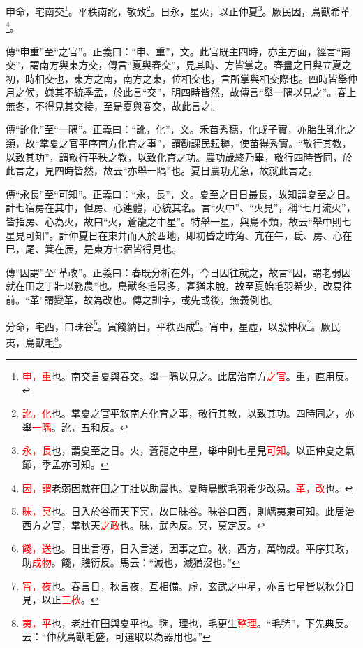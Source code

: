 申命，宅南交\footnote{\textcolor{red}{申，重}也。南交言夏與春交。舉一隅以見之。此居治南方\textcolor{red}{之官}。重，直用反。}。平秩南訛，敬致\footnote{\textcolor{red}{訛，化}也。掌夏之官平敘南方化育之事，敬行其教，以致其功。四時同之，亦舉\textcolor{red}{一隅}。訛，五和反。}。日永，星火，以正仲夏\footnote{\textcolor{red}{永，長}也，謂夏至之日。火，蒼龍之中星，舉中則七星見\textcolor{red}{可知}。以正仲夏之氣節，季孟亦可知。}。厥民因，鳥獸希革\footnote{\textcolor{red}{因，謂}老弱因就在田之丁壯以助農也。夏時鳥獸毛羽希少改易。\textcolor{red}{革，改}也。}。

{\noindent\zhuan{}\fzbyks 傳“申重”至“之官”。正義曰：“申、重”，文。此官既主四時，亦主方面，經言“南交”，謂南方與東方交，傳言“夏與春交”，見其時、方皆掌之。春盡之日與立夏之初，時相交也，東方之南，南方之東，位相交也，言所掌與相交際也。四時皆舉仲月之候，嫌其不統季孟，於此言“交”，明四時皆然，故傳言“舉一隅以見之”。春上無冬，不得見其交接，至是夏與春交，故此言之。 \par}

{\noindent\zhuan{}\fzbyks 傳“訛化”至“一隅”。正義曰：“訛，化”，文。禾苗秀穗，化成子實，亦胎生乳化之類，故“掌夏之官平序南方化育之事”，謂勸課民耘耨，使苗得秀實。“敬行其教，以致其功”，謂敬行平秩之教，以致化育之功。農功歲終乃畢，敬行四時皆同，於此言之，見四時皆然，故云“亦舉一隅”也。夏日農功尤急，故就此言之。 \par}

{\noindent\zhuan{}\fzbyks 傳“永長”至“可知”。正義曰：“永，長”，文。夏至之日日最長，故知謂夏至之日。計七宿房在其中，但房、心連體，心統其名。言“火中”、“火見”，稱“七月流火”，皆指房、心為火，故曰“火，蒼龍之中星”。特舉一星，與鳥不類，故云“舉中則七星見可知”。計仲夏日在東井而入於酉地，即初昏之時角、亢在午，氐、房、心在巳，尾、箕在辰，是東方七宿皆得見也。 \par}

{\noindent\zhuan{}\fzbyks 傳“因謂”至“革改”。正義曰：春既分析在外，今日因往就之，故言“因，謂老弱因就在田之丁壯以務農”也。鳥獸冬毛最多，春猶未脫，故至夏始毛羽希少，改易往前。“革”謂變革，故為改也。傳之訓字，或先或後，無義例也。 \par}

分命，宅西，曰昧谷\footnote{\textcolor{red}{昧，冥}也。日入於谷而天下冥，故曰昧谷。昧谷曰西，則嵎夷東可知。此居治西方之官，掌秋天\textcolor{red}{之政}也。昧，武內反。冥，莫定反。}。寅餞納日，平秩西成\footnote{\textcolor{red}{餞，送}也。日出言導，日入言送，因事之宜。秋，西方，萬物成。平序其政，助\textcolor{red}{成物}。餞，賤衍反。馬云：“滅也，滅猶沒也。”}。宵中，星虛，以殷仲秋\footnote{\textcolor{red}{宵，夜}也。春言日，秋言夜，互相備。虛，玄武之中星，亦言七星皆以秋分日見，以正\textcolor{red}{三秋}。}。厥民夷，鳥獸毛\footnote{\textcolor{red}{夷，平}也，老壯在田與夏平也。毨，理也，毛更生\textcolor{red}{整理}。“毛毨”，下先典反。云：“仲秋鳥獸毛盛，可選取以為器用也。”}。

